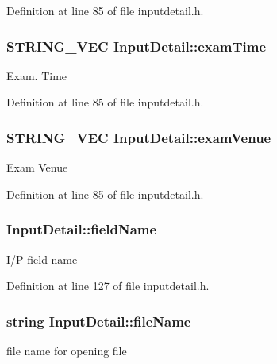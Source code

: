 Definition at line 85 of file inputdetail.\-h.

\hypertarget{classInputDetail_a847dd8bb2f0c43960746cfa4d2310a15}{
\subsubsection[{exam\-Time}]{\setlength{\rightskip}{0pt plus 5cm}S\-T\-R\-I\-N\-G\-\_\-\-V\-E\-C Input\-Detail\-::exam\-Time\hspace{0.3cm}{\ttfamily [protected]}}}\label{classInputDetail_a847dd8bb2f0c43960746cfa4d2310a15}
Exam. Time 

Definition at line 85 of file inputdetail.\-h.

\hypertarget{classInputDetail_a695928668a413ac052776c0b6cb27501}{
\subsubsection[{exam\-Venue}]{\setlength{\rightskip}{0pt plus 5cm}S\-T\-R\-I\-N\-G\-\_\-\-V\-E\-C Input\-Detail\-::exam\-Venue\hspace{0.3cm}{\ttfamily [protected]}}}\label{classInputDetail_a695928668a413ac052776c0b6cb27501}
Exam Venue 

Definition at line 85 of file inputdetail.\-h.

\hypertarget{classInputDetail_ac6f85380c5152c406d483726382c4798}{
\subsubsection[{field\-Name}]{ Input\-Detail\-::field\-Name}}\label{classInputDetail_ac6f85380c5152c406d483726382c4798}
I/\-P field name 

Definition at line 127 of file inputdetail.\-h.

\hypertarget{classInputDetail_a4a7fb27e52bed0f40de143634f2c486b}{
\subsubsection[{file\-Name}]{\setlength{\rightskip}{0pt plus 5cm}string Input\-Detail\-::file\-Name\hspace{0.3cm}{\ttfamily [protected]}}}\label{classInputDetail_a4a7fb27e52bed0f40de143634f2c486b}
file name for opening file 


